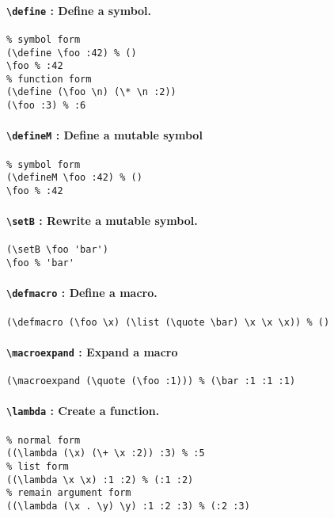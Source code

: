 \documentclass[10pt,a4paper]{article}
\newcommand{\pT}[1]{\textbf{\texttt{\textbackslash #1}}}
\begin{document}
\paragraph{\pT{define} : Define a symbol.}
\begin{verbatim}
% symbol form
(\define \foo :42) % ()
\foo % :42
% function form
(\define (\foo \n) (\* \n :2))
(\foo :3) % :6
\end{verbatim}


\paragraph{\pT{defineM} : Define a mutable symbol}
\begin{verbatim}
% symbol form
(\defineM \foo :42) % ()
\foo % :42
\end{verbatim}


\paragraph{\pT{setB} : Rewrite a mutable symbol.}
\begin{verbatim}
(\setB \foo 'bar')
\foo % 'bar'
\end{verbatim}


\paragraph{\pT{defmacro} : Define a macro.}
\begin{verbatim}
(\defmacro (\foo \x) (\list (\quote \bar) \x \x \x)) % ()
\end{verbatim}


\paragraph{\pT{macroexpand} : Expand a macro}
\begin{verbatim}
(\macroexpand (\quote (\foo :1))) % (\bar :1 :1 :1)
\end{verbatim}


\paragraph{\pT{lambda} : Create a function.}

\begin{verbatim}
% normal form
((\lambda (\x) (\+ \x :2)) :3) % :5
% list form
((\lambda \x \x) :1 :2) % (:1 :2)
% remain argument form
((\lambda (\x . \y) \y) :1 :2 :3) % (:2 :3)
\end{verbatim}
\end{document}
